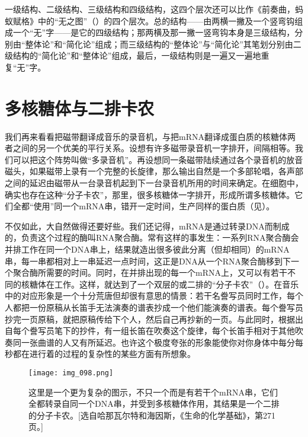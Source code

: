 一级结构、二级结构、三级结构和四级结构，这四个层次还可以比作《前奏曲，蚂蚁赋格》中的“无之图”（）的四个层次。总的结构——由两横一撇及一个竖弯钩组成一个“无”字——是它的四级结构；那两横及那一撇一竖弯钩本身是三级结构，分别由“整体论”和“简化论”组成；而三级结构的“整体论”与“简化论”其笔划分别由二级结构的“简化论”和“整体论”组成，最后，一级结构则是一遍又一遍地重复“无”字。

\section{多核糖体与二排卡农}

我们再来看看把磁带翻译成音乐的录音机，与把mRNA翻译成蛋白质的核糖体两者之间的另一个优美的平行关系。设想有许多磁带录音机一字排开，间隔相等。我们可以把这个阵势叫做“多录音机”。再设想同一条磁带陆续通过各个录音机的放音磁头，如果磁带上录有一个完整的长旋律，那么输出自然是一个多部轮唱，各声部之间的延迟由磁带从一台录音机起到下一台录音机所用的时间来确定。在细胞中，确实也存在这种“分子卡农”，那里，很多核糖体一字排开，形成所谓多核糖体。它们全都“使用”同一个mRNA串，错开一定时间，生产同样的蛋白质（见）。

\begin{figure}
\end{figure}

不仅如此，大自然做得还要好些。我们还记得，mRNA是通过转录DNA而制成的，负责这个过程的酶叫RNA聚合酶。常有这样的事发生：一系列RNA聚合酶会并排工作在同一个DNA串上，结果就造出很多彼此分离（但却相同）的mRNA串，每一串都相对上一串延迟一点时间，这正是DNA从一个RNA聚合酶移到下一个聚合酶所需要的时间。同时，在并排出现的每一个mRNA上，又可以有若干不同的核糖体在工作。这样，就达到了一个双层的或二排的“分子卡农”（）。在音乐中的对应形象是一个十分荒唐但却很有意思的情景：若干名誊写员同时工作，每个人都把一份原稿从长笛手无法演奏的谱表抄成一个他们能演奏的谱表。每个誊写员抄完一页原稿，就把原稿传给下个人，然后自己再抄新的一页。与此同时，根据出自每个誊写员笔下的抄件，有一组长笛在吹奏这个旋律，每个长笛手相对于其他吹奏同一张曲谱的人又有所延迟。也许这个极度夸张的形象能使你对你身体中每分每秒都在进行着的过程的复杂性的某些方面有所想象。

\begin{figure}
\texttt{[image: img\_098.png]}
\caption[二排的分子卡农。]
  {这里是一个更为复杂的图示，不只一个而是有若干个mRNA串，它们全都转录自同一个DNA串，并受到多核糖体作用，其结果是一个二排的分子卡农。[选自哈那瓦尔特和海因斯，《生命的化学基础》，第271页。]}
\end{figure}

